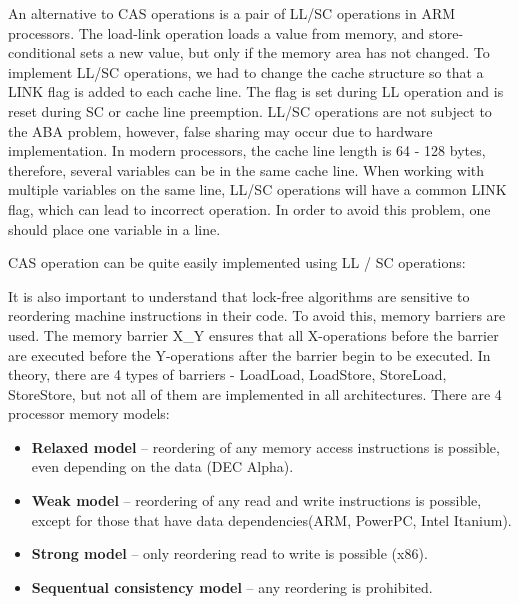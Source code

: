 {\begin{figure}[H]
		\label{CAS:image}
	\end{figure}
	\par An alternative to CAS operations is a pair of LL/SC operations in ARM processors. The load-link operation loads a value from memory, and store-conditional sets a new value, but only if the memory area has not changed. To implement LL/SC operations, we had to change the cache structure so that a LINK flag is added to each cache line. The flag is set during LL operation and is reset during SC or cache line preemption. LL/SC operations are not subject to the ABA problem, however, false sharing may occur due to hardware implementation. In modern processors, the cache line length is 64 - 128 bytes, therefore, several variables can be in the same cache line. When working with multiple variables on the same line, LL/SC operations will have a common LINK flag, which can lead to incorrect operation. In order to avoid this problem, one should place one variable in a line.
	\begin{figure}[H]
		
	\end{figure}
	\par CAS operation can be quite easily implemented using LL / SC operations:
	\begin{figure}[H]
		
	\end{figure}
	\par It is also important to understand that lock-free algorithms are sensitive to reordering machine instructions in their code. To avoid this, memory barriers are used. The memory barrier X\_Y ensures that all X-operations before the barrier are executed before the Y-operations after the barrier begin to be executed. In theory, there are 4 types of barriers - LoadLoad, LoadStore, StoreLoad, StoreStore, but not all of them are implemented in all architectures. There are 4 processor memory models:
	\begin{itemize}  
		\item\textbf{Relaxed model} -- reordering of any memory access instructions is possible, even depending on the data (DEC Alpha).
		\item\textbf{Weak model} -- reordering of any read and write instructions is possible, except for those that have data dependencies(ARM, PowerPC, Intel Itanium).
		\item\textbf{Strong model } -- only reordering read to write is possible (x86).
		\item\textbf{Sequentual consistency model} -- any reordering is prohibited.

\end{itemize}}

